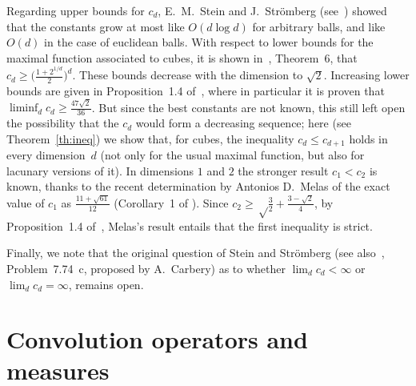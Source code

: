 \documentclass[12pt,a4paper]{amsart}
\theoremstyle{plain}
\theoremstyle{remark}
\begin{document}
Regarding upper bounds
for $c_d$, E.~M.~Stein and J.~Str\"omberg (see~\cite{StSt}) showed
that the constants grow at most like $O(d \log d)$ for arbitrary balls, and
like $O(d)$ in the case of euclidean balls. With respect to lower
bounds for the maximal function associated to cubes, it is shown
in~\cite{MeSo}, Theorem~6,
that $c_d \ge \big( \frac{1+2^{1/d}}{2} \big)^d$.
These bounds decrease with the dimension to $\sqrt{2}$. Increasing lower
bounds are given in Proposition~1.4 of~\cite{A2}, where in particular
it is proven that $\liminf_d c_d \ge \frac{47 \sqrt{2}}{36}$.
But since the best constants are not known, this still left open
the possibility that the $c_d$ would form a decreasing sequence;
here (see Theorem~\ref{th:ineq}) we show that, for cubes, the
inequality $c_d\le c_{d+1}$ holds in every dimension~$d$ 
(not only for the usual maximal function, but also for
lacunary versions of it).
In dimensions $1$ and $2$ the stronger result
$c_1 < c_2$ is known, thanks to the recent determination by Antonios
D.~Melas of the exact value of $c_1$ as $\frac{11
+ \sqrt{61}}{12}$ (Corollary~1 of \cite{Mel2}). Since  $c_2 \ge
\sqrt\frac32 + \frac{3-\sqrt2}4$, by Proposition~1.4 of~\cite{A2},
Melas's result entails that the first inequality is strict.

Finally, we note that the original question of Stein and Str\"omberg (see
also~\cite{BH}, Problem~7.74~c, proposed by A.~Carbery) as to whether
$\lim_d c_d < \infty$ or $\lim_d c_d = \infty$, remains open.

\section{Convolution operators and measures}
\end{document}
